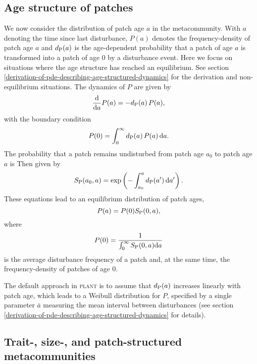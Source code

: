 \documentclass[10pt,twoside]{article}
\newcommand{\plant}{\textsc{plant}}
\begin{document}
\subsection{Age structure of
patches}\label{age-structured-distribution-of-patches}

We now consider the distribution of patch age \(a\) in the metacommunity.
With \(a\) denoting the time since last disturbance, \(P(a)\) denotes the
frequency-density of patch age \(a\) and \(d_{\rm P}(a)\) is the
age-dependent probability that a patch of age \(a\) is transformed into
a patch of age 0 by a disturbance event. Here we focus on situations
where the age structure has reached an equilibrium. See section
\ref{derivation-of-pde-describing-age-structured-dynamics} for the derivation and
non-equilibrium situations. The dynamics of \(P\) are given by
\citep{Mckendrick-1926, Vonfoerster-1959}
\begin{equation} \label{eq:agepde}
\frac{{\rm d}}{{\rm d} a} P(a) = - d_{\rm P}(a) \, P(a) ,
\end{equation}
with the boundary condition
\begin{equation} P(0) = \int_0^\infty d_{\rm P}(a) \, P(a) \, {\rm d} a.
\end{equation}
The probability that a patch remains undisturbed from patch age \(a_0\) to patch age \(a\) is
Then given by
\begin{equation} \label{eq:survivalPatch}
S_{\rm P} (a_0, a) = \exp\left( - \int_{a_0}^{a} d_{\rm P}(a^\prime) \, {\rm d} a^\prime \right).
\end{equation}
These equations lead to an equilibrium distribution of patch ages,
\begin{equation} P(a) = P(0) S_{\rm P} (0, a),
\end{equation}
where
\begin{equation}
P(0) = \frac1{\int_0^\infty S_{\rm P} (0, a) {\rm d}a}
\end{equation}
is the average disturbance frequency of a patch and, at the same time, the frequency-density of patches of
age \(0\).

The default approach in {\plant} is to assume that $d_{\rm P}(a)$
increases linearly with patch age, which leads to a Weibull distribution for $P$,
specified by a single parameter $\bar{a}$
measuring the mean interval between disturbances (see section \ref{derivation-of-pde-describing-age-structured-dynamics} for details).

\subsection{Trait-, size-, and patch-structured
metacommunities}\label{trait--size--and-patch-structured-metapopulations}
\end{document}
